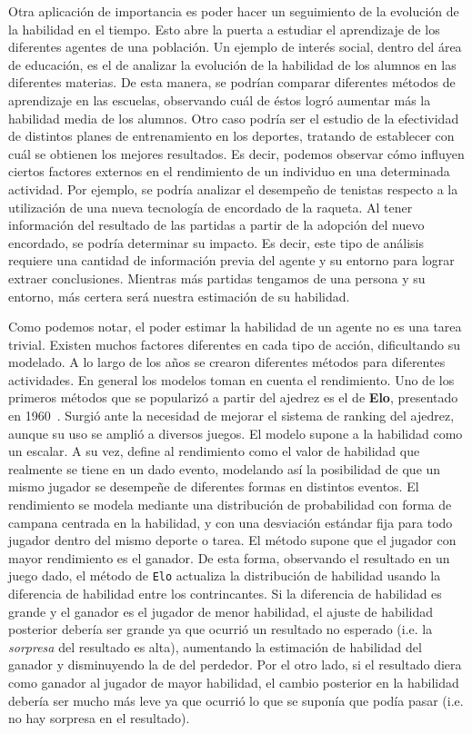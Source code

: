 \documentclass[11pt,twoside,spanish]{report} %
\begin{document}
Otra aplicaci\'on de importancia es poder hacer un seguimiento de la evoluci\'on de la habilidad en el tiempo.
Esto abre la puerta a estudiar el aprendizaje de los diferentes agentes de una poblaci\'on.
Un ejemplo de inter\'es social, dentro del \'area de educaci\'on, es el de analizar la evoluci\'on de la habilidad de los alumnos en las diferentes materias.
De esta manera, se podr\'ian comparar diferentes m\'etodos de aprendizaje en las escuelas, observando cu\'al de \'estos logr\'o aumentar m\'as la habilidad media de los alumnos.
Otro caso podr\'ia ser el estudio de la efectividad de distintos planes de entrenamiento en los deportes, tratando de establecer con cu\'al se obtienen los mejores resultados.
Es decir, podemos observar c\'omo influyen ciertos factores externos en el rendimiento de un individuo en una determinada actividad.
Por ejemplo, se podr\'ia analizar el desempe\~no de tenistas respecto a la utilizaci\'on de una nueva tecnolog\'ia de encordado de la raqueta.
Al tener informaci\'on del resultado de las partidas a partir de la adopci\'on del nuevo encordado, se podr\'ia determinar su impacto.
Es decir, este tipo de an\'alisis requiere una cantidad de informaci\'on previa del agente y su entorno para lograr extraer conclusiones.
Mientras m\'as partidas tengamos de una persona y su entorno, m\'as certera ser\'a nuestra estimaci\'on de su habilidad.

Como podemos notar, el poder estimar la habilidad de un agente no es una tarea trivial.
Existen muchos factores diferentes en cada tipo de acci\'on, dificultando su modelado.
A lo largo de los a\~nos se crearon diferentes m\'etodos para diferentes actividades.
En general los modelos toman en cuenta el rendimiento.
Uno de los primeros m\'etodos que se populariz\'o a partir del ajedrez es el de \textbf{Elo}, presentado en 1960~\cite{elo1961-uscf,Elo2008}.
Surgi\'o ante la necesidad de mejorar el sistema de ranking del ajedrez, aunque su uso se ampli\'o a diversos juegos. 
El modelo supone a la habilidad como un escalar.
A su vez, define al rendimiento como el valor de habilidad que realmente se tiene en un dado evento, modelando as\'i la posibilidad de que un mismo jugador se desempe\~ne de diferentes formas en distintos eventos.
El rendimiento se modela mediante una distribuci\'on de probabilidad con forma de campana centrada en la habilidad, y con una desviaci\'on est\'andar fija para todo jugador dentro del mismo deporte o tarea.
El m\'etodo supone que el jugador con mayor rendimiento es el ganador.
De esta forma, observando el resultado en un juego dado, el m\'etodo de \texttt{Elo} actualiza la distribuci\'on de habilidad usando la diferencia de habilidad entre los contrincantes.
Si la diferencia de habilidad es grande y el ganador es el jugador de menor habilidad, el ajuste de habilidad posterior deber\'ia ser grande ya que ocurri\'o un resultado no esperado (i.e. la \emph{sorpresa} del resultado es alta), aumentando la estimaci\'on de habilidad del ganador y disminuyendo la de del perdedor. 
Por el otro lado, si el resultado diera como ganador al jugador de mayor habilidad, el cambio posterior en la habilidad deber\'ia ser mucho m\'as leve ya que ocurri\'o lo que se supon\'ia que pod\'ia pasar (i.e. no hay sorpresa en el resultado).
\end{document}
